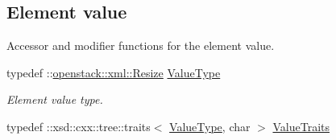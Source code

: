 \subsection*{Element value}
\label{_amgrp2ee2eae1a8c390ea033f241c027da8d6}
Accessor and modifier functions for the element value. \begin{DoxyCompactItemize}
\item 
\hypertarget{classopenstack_1_1xml_1_1Resize___a093cf30a127508789f92b7ebd1fd30de}{
typedef ::\hyperlink{classopenstack_1_1xml_1_1Resize}{openstack::xml::Resize} \hyperlink{classopenstack_1_1xml_1_1Resize___a093cf30a127508789f92b7ebd1fd30de}{ValueType}}
\label{classopenstack_1_1xml_1_1Resize___a093cf30a127508789f92b7ebd1fd30de}

\begin{DoxyCompactList}\small\item\em Element value type. \item\end{DoxyCompactList}\item 
\hypertarget{classopenstack_1_1xml_1_1Resize___aec7999dc415b9f061996ca113aeb2183}{
typedef ::xsd::cxx::tree::traits$<$ \hyperlink{classopenstack_1_1xml_1_1Resize}{ValueType}, char $>$ \hyperlink{classopenstack_1_1xml_1_1Resize___aec7999dc415b9f061996ca113aeb2183}{ValueTraits}}
\label{classopenstack_1_1xml_1_1Resize___aec7999dc415b9f061996ca113aeb2183}


\end{DoxyCompactItemize}
